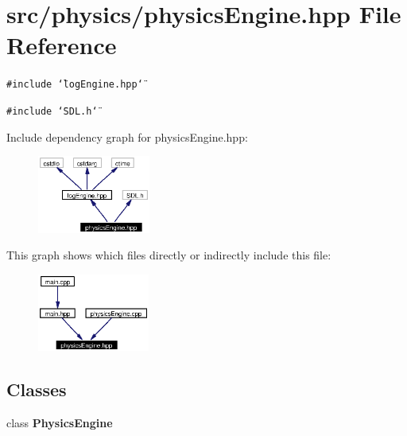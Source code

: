 \section{src/physics/physics\-Engine.hpp File Reference}
\label{physicsEngine_8hpp}
{\tt \#include \char`\"{}log\-Engine.hpp\char`\"{}}\par
{\tt \#include \char`\"{}SDL.h\char`\"{}}\par


Include dependency graph for physics\-Engine.hpp:\begin{figure}[H]
\begin{center}
\leavevmode
\includegraphics[width=105pt]{physicsEngine_8hpp__incl}
\end{center}
\end{figure}


This graph shows which files directly or indirectly include this file:\begin{figure}[H]
\begin{center}
\leavevmode
\includegraphics[width=104pt]{physicsEngine_8hpp__dep__incl}
\end{center}
\end{figure}
\subsection*{Classes}
\begin{CompactItemize}
\item 
class {\bf Physics\-Engine}
\end{CompactItemize}
